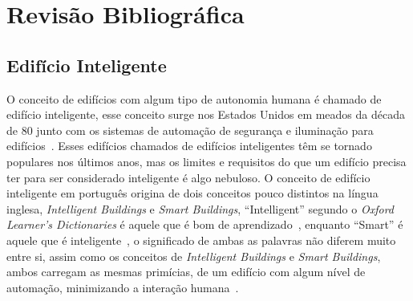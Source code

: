 \chapter{Revisão Bibliográfica}
\section{Edifício Inteligente}

O conceito de edifícios com algum tipo de autonomia humana é chamado de edifício inteligente, esse conceito surge nos Estados Unidos em meados da década de 80 junto 
com os sistemas de automação de segurança e iluminação para edifícios~\cite{raissa2002}. Esses edifícios chamados de edifícios inteligentes têm se tornado populares 
nos últimos anos, mas os limites e requisitos do que um edifício precisa ter para ser considerado inteligente é algo nebuloso. O conceito de edifício inteligente em 
português origina de dois conceitos pouco distintos na língua inglesa, \emph{Intelligent Buildings} e \emph{Smart Buildings},
``Intelligent'' segundo o \emph{Oxford Learner's Dictionaries} é aquele que é bom de aprendizado~\cite{intelligence-oxford}, enquanto ``Smart'' é aquele que é 
inteligente~\cite{smart-oxford}, o significado de ambas as palavras não diferem muito entre si, assim como os conceitos de \emph{Intelligent Buildings} e 
\emph{Smart Buildings}, ambos carregam as mesmas primícias, de um edifício com algum nível de automação, minimizando a interação humana~\cite{Wong2005}.

